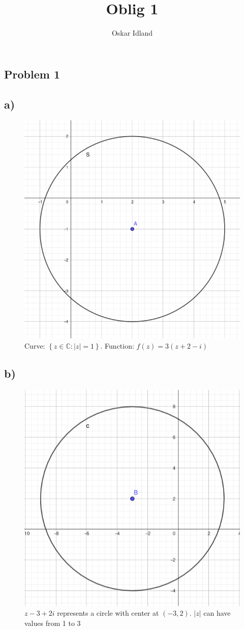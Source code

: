 \documentclass{article}
\author{Oskar Idland}
\title{Oblig 1}
\date{}
\begin{document}
\maketitle
\newpage

\subsection*{Problem 1}
\subsection*{a)}
\begin{figure}[h!]
\centering
\includegraphics[width = .5\textwidth]{1a.png}
\caption{Curve: $\left\{z ∈ ℂ : \left|z\right| = 1\right\}$. Function: $f(z) = 3(z+2-i)$}
\label{fig: 1a}
\end{figure}

\subsection*{b)}
\begin{figure}[h!]
\centering
\includegraphics[width = \textwidth]{1b.png}
\caption{$z-3+2i$ represents a circle with center at $(-3,2)$. $\left|z\right|$ can have values from 1 to 3}
\label{fig: }
\end{figure}
\end{document}
